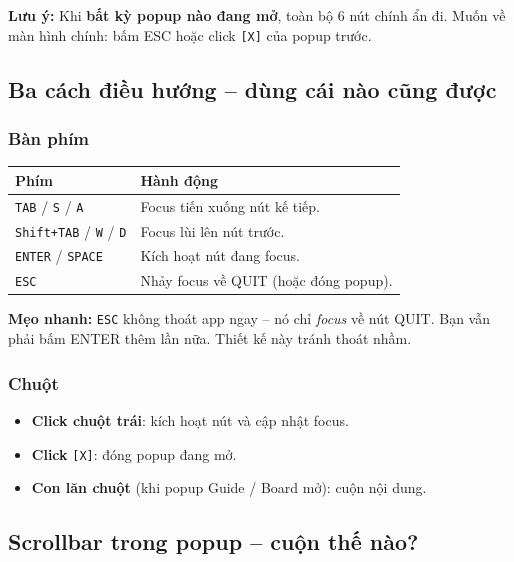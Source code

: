\documentclass[12pt,a4paper]{article}
\renewcommand{\tipbox}[1]{%
  \vspace{4pt}%
  \noindent\colorbox{yellow!18}{\begin{minipage}{0.96\linewidth}%
    \vspace{2pt}\textbf{Mẹo nhanh:} #1\vspace{2pt}%
  \end{minipage}}%
  \vspace{4pt}%
}
\renewcommand{\notebox}[1]{%
  \vspace{4pt}%
  \noindent\colorbox{cyan!12}{\begin{minipage}{0.96\linewidth}%
    \vspace{2pt}\textbf{Lưu ý:} #1\vspace{2pt}%
  \end{minipage}}%
  \vspace{4pt}%
}
\begin{document}
\notebox{Khi \textbf{bất kỳ popup nào đang mở}, toàn bộ 6 nút chính ẩn đi.
Muốn về màn hình chính: bấm ESC hoặc click \texttt{[X]} của popup trước.}

\subsection{Ba cách điều hướng -- dùng cái nào cũng được}

\subsubsection{Bàn phím}

\vspace{4pt}
\begin{tabularx}{\linewidth}{|l|X|}
    \hline
    \textbf{Phím}                                   & \textbf{Hành động} \\
    \hline
    \texttt{TAB} / \texttt{S} / \texttt{A}          & Focus tiến xuống nút kế tiếp. \\
    \hline
    \texttt{Shift+TAB} / \texttt{W} / \texttt{D}    & Focus lùi lên nút trước. \\
    \hline
    \texttt{ENTER} / \texttt{SPACE}                 & Kích hoạt nút đang focus. \\
    \hline
    \texttt{ESC}                                    & Nhảy focus về QUIT (hoặc đóng popup). \\
    \hline
\end{tabularx}

\tipbox{\texttt{ESC} không thoát app ngay -- nó chỉ \textit{focus} về nút QUIT.
Bạn vẫn phải bấm ENTER thêm lần nữa. Thiết kế này tránh thoát nhầm.}

\subsubsection{Chuột}

\begin{itemize}
    \item \textbf{Click chuột trái}: kích hoạt nút và cập nhật focus.
    \item \textbf{Click} \texttt{[X]}: đóng popup đang mở.
    \item \textbf{Con lăn chuột} (khi popup Guide / Board mở): cuộn nội dung.
\end{itemize}

\subsection{Scrollbar trong popup -- cuộn thế nào?}
\end{document}
